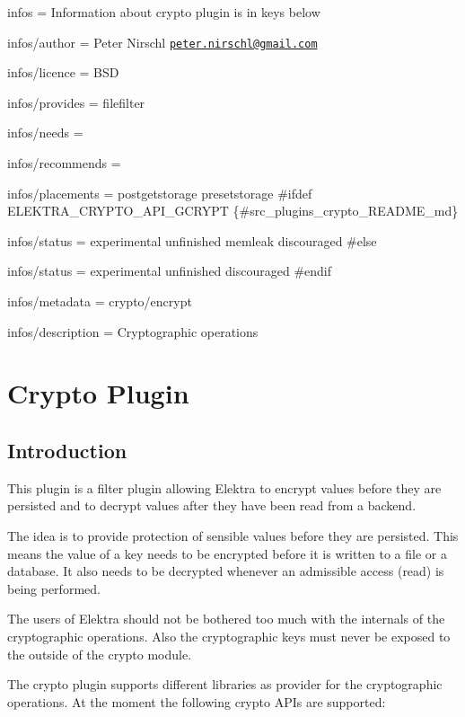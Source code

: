 
\begin{DoxyItemize}
\item infos = Information about crypto plugin is in keys below
\item infos/author = Peter Nirschl \href{mailto:peter.nirschl@gmail.com}{\tt peter.\+nirschl@gmail.\+com}
\item infos/licence = B\+S\+D
\item infos/provides = filefilter
\item infos/needs =
\item infos/recommends =
\item infos/placements = postgetstorage presetstorage \#ifdef E\+L\+E\+K\+T\+R\+A\+\_\+\+C\+R\+Y\+P\+T\+O\+\_\+\+A\+P\+I\+\_\+\+G\+C\+R\+Y\+P\+T \{\#src\+\_\+plugins\+\_\+crypto\+\_\+\+R\+E\+A\+D\+M\+E\+\_\+md\}
\item infos/status = experimental unfinished memleak discouraged \#else
\item infos/status = experimental unfinished discouraged \#endif
\item infos/metadata = crypto/encrypt
\item infos/description = Cryptographic operations
\end{DoxyItemize}

\section*{Crypto Plugin}

\subsection*{Introduction}

This plugin is a filter plugin allowing Elektra to encrypt values before they are persisted and to decrypt values after they have been read from a backend.

The idea is to provide protection of sensible values before they are persisted. This means the value of a key needs to be encrypted before it is written to a file or a database. It also needs to be decrypted whenever an admissible access (read) is being performed.

The users of Elektra should not be bothered too much with the internals of the cryptographic operations. Also the cryptographic keys must never be exposed to the outside of the crypto module.

The crypto plugin supports different libraries as provider for the cryptographic operations. At the moment the following crypto A\+P\+Is are supported\+:


